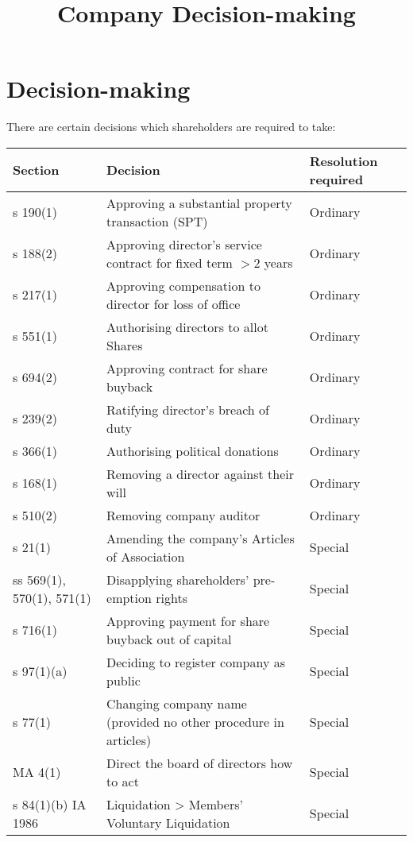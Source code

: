 \documentclass[
]{article}
\title{Company Decision-making}
\author{}
\date{}
\begin{document}
\maketitle

{
\setcounter{tocdepth}{3}
\tableofcontents
}
\hypertarget{decision-making}{%
\section{Decision-making}\label{decision-making}}

There are certain decisions which shareholders are required to take:

\begin{longtable}[]{@{}lll@{}}
\toprule()
Section & Decision & Resolution required \\
\midrule()
\endhead
s 190(1) & Approving a substantial property transaction (SPT) &
Ordinary \\
s 188(2) & Approving director's service contract for fixed term
{\(> 2\)} years & Ordinary \\
s 217(1) & Approving compensation to director for loss of office &
Ordinary \\
s 551(1) & Authorising directors to allot Shares & Ordinary \\
s 694(2) & Approving contract for share buyback & Ordinary \\
s 239(2) & Ratifying director's breach of duty & Ordinary \\
s 366(1) & Authorising political donations & Ordinary \\
s 168(1) & Removing a director against their will & Ordinary \\
s 510(2) & Removing company auditor & Ordinary \\
s 21(1) & Amending the company's Articles of Association & Special \\
ss 569(1), 570(1), 571(1) & Disapplying shareholders' pre-emption rights
& Special \\
s 716(1) & Approving payment for share buyback out of capital &
Special \\
s 97(1)(a) & Deciding to register company as public & Special \\
s 77(1) & Changing company name (provided no other procedure in
articles) & Special \\
MA 4(1) & Direct the board of directors how to act & Special \\
s 84(1)(b) IA 1986 & Liquidation \textgreater{} Members' Voluntary
Liquidation & Special \\
\bottomrule()
\end{longtable}
\end{document}
